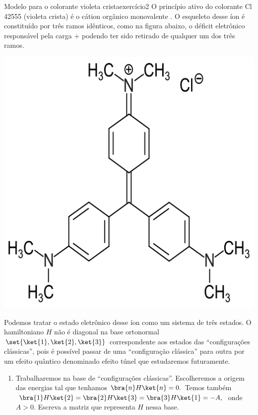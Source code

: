 \begin{exercício}{Modelo para o colorante violeta crista}{exercício2}
    O princípio ativo do colorante Cl 42555 (violeta crista) é o cátion orgânico monovalente . O esqueleto desse íon é constituído por três ramos idênticos, como na figura abaixo, o déficit eletrônico responsável pela carga \(+\) podendo ter sido retirado de qualquer um dos três ramos.
    \begin{center}
        \includegraphics[height=0.15\textheight]{Cl42555.png}
    \end{center}
    Podemos tratar o estado eletrônico desse íon como um sistema de três estados. O hamiltoniano \(H\) não é diagonal na base ortonormal \(\set{\ket{1},\ket{2}, \ket{3}}\) correspondente aos estados das \enquote{configurações clássicas}, pois é possível passar de uma \enquote{configuração clássica} para outra por um efeito quântico denominado efeito túnel que estudaremos futuramente.
    \begin{enumerate}[label=(\alph*)]
        \item Trabalharemos na base de \enquote{configurações clássicas}. Escolheremos a origem das energias tal que tenhamos \(\bra{n}H\ket{n} = 0.\) Temos também \(\bra{1}H\ket{2} = \bra{2}H\ket{3} = \bra{3}H\ket{1} = -A,\) onde \(A > 0\). Escreva a matriz que representa \(H\) nessa base.

\end{enumerate}
\end{exercício}
